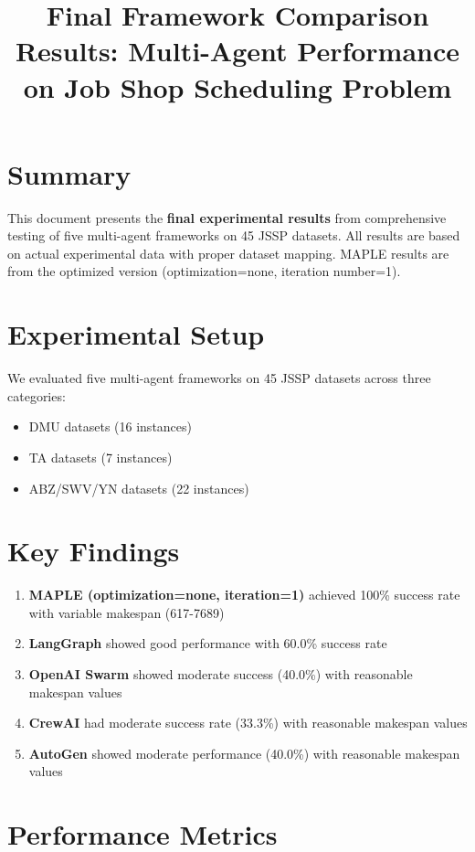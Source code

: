 \documentclass[11pt]{article}
\title{Final Framework Comparison Results: Multi-Agent Performance on Job Shop Scheduling Problem}
\author{}
\date{}
\begin{document}
\maketitle

\section{Summary}

This document presents the \textbf{final experimental results} from comprehensive testing of five multi-agent frameworks on 45 JSSP datasets. All results are based on actual experimental data with proper dataset mapping. MAPLE results are from the optimized version (optimization=none, iteration number=1).

\section{Experimental Setup}

We evaluated five multi-agent frameworks on 45 JSSP datasets across three categories:
\begin{itemize}
    \item DMU datasets (16 instances)
    \item TA datasets (7 instances) 
    \item ABZ/SWV/YN datasets (22 instances)
\end{itemize}

\section{Key Findings}

\begin{enumerate}
    \item \textbf{MAPLE (optimization=none, iteration=1)} achieved 100\% success rate with variable makespan (617-7689)
    \item \textbf{LangGraph} showed good performance with 60.0\% success rate
    \item \textbf{OpenAI Swarm} showed moderate success (40.0\%) with reasonable makespan values
    \item \textbf{CrewAI} had moderate success rate (33.3\%) with reasonable makespan values
    \item \textbf{AutoGen} showed moderate performance (40.0\%) with reasonable makespan values
\end{enumerate}

\section{Performance Metrics}
\end{document}
